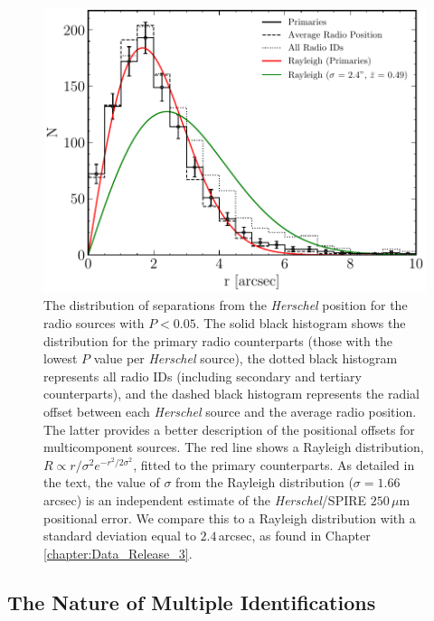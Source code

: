 \begin{figure}
	\centering
	\includegraphics[width=0.8\columnwidth]{Figures/source_counterpart_offsets.pdf}
	\caption[Distribution of radial offsets between \textit{Herschel} sources and radio IDs]{The distribution of separations from the \textit{Herschel} position for the radio sources with $P < 0.05$. The solid black histogram shows the distribution for the primary radio counterparts (those with the lowest $P$ value per \textit{Herschel} source), the dotted black histogram represents all radio IDs (including secondary and tertiary counterparts), and the dashed black histogram represents the radial offset between each \textit{Herschel} source and the average radio position. The latter provides a better description of the positional offsets for multicomponent sources. The red line shows a Rayleigh distribution, $R \propto r/\sigma^2 e^{-r^2/2\sigma^2}$, fitted to the primary counterparts. As detailed in the text, the value of $\sigma$ from the Rayleigh distribution ($\sigma = 1.66\,$arcsec) is an independent estimate of the \textit{Herschel}/SPIRE $250\,\mu$m positional error. We compare this to a Rayleigh distribution with a standard deviation equal to $2.4\,$arcsec, as found in Chapter \ref{chapter:Data_Release_3}.}
	\label{fig:source_counterpart_offset}
\end{figure}

\subsection{The Nature of Multiple Identifications}
\label{sec:multiple_systems}


